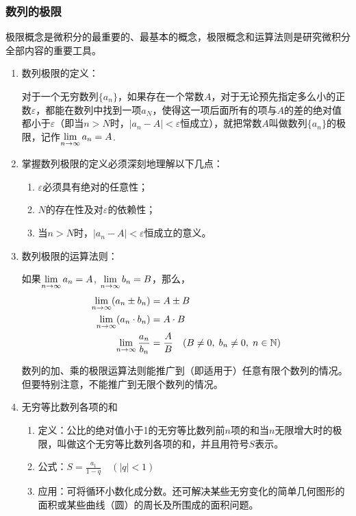\subsubsection{数列的极限}
极限概念是微积分的最重要的、最基本的概念，极限概念和运算法则是研究微积分全部内容的重要工具。
\begin{enumerate}
    \item 数列极限的定义：

对于一个无穷数列$\{a_n\}$，如果存在一个常数$A$，对于无论预先指定多么小的正数$\varepsilon$，都能在数列中找到一项$a_N$，使得这一项后面所有的项与$A$的差的绝对值都小于$\varepsilon$（即当$n>N$时，$|a_n-A|<\varepsilon$恒成立），就把常数$A$叫做数列$\{a_n\}$的极限，记作$\lim\limits_{n\to \infty}a_n=A$.

\item 掌握数列极限的定义必须深刻地理解以下几点：
\begin{enumerate}[(1)]
\item $\varepsilon$必须具有绝对的任意性；
\item $N$的存在性及对$\varepsilon$的依赖性；
\item 当$n>N$时，$|a_n-A|<\varepsilon$恒成立的意义。
\end{enumerate}

\item 数列极限的运算法则：

\begin{thm}{}
 如果$\lim\limits_{n\to \infty}a_n=A$, $\lim\limits_{n\to \infty}b_n=B$，那么，
 \[\begin{split}
     \lim\limits_{n\to \infty}(a_n\pm b_n)&=A\pm B\\
     \lim\limits_{n\to \infty}(a_n\cdot  b_n)&=A\cdot B\\
     \lim\limits_{n\to \infty}\dfrac{a_n}{b_n}&=\dfrac{A}{B}\quad (B\ne 0,\; b_n\ne 0,\; n\in\mathbb{N})\\
 \end{split}\]
\end{thm}

\begin{note}
数列的加、乘的极限运算法则能推广到（即适用于）任意有限个数列的情况。但要特别注意，不能推广到无限个数列的情况。
\end{note}

\item 无穷等比数列各项的和
\begin{enumerate}[(1)]
\item 定义：公比的绝对值小于1的无穷等比数列前$n$项的和当$n$无限增大时的极限，叫做这个无穷等比数列各项的和，并且用符号$S$表示。
\item 公式：$S=\frac{a_1}{1-q}\quad (|q|<1)$
\item 应用：可将循环小数化成分数。还可解决某些无穷变化的简单几何图形的面积或某些曲线（圆）的周长及所围成的面积问题。
\end{enumerate}
\end{enumerate}


